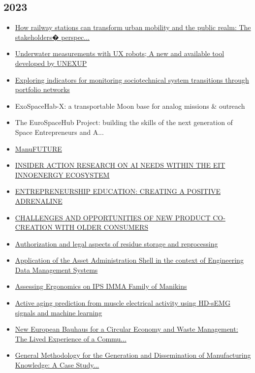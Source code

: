 \subsection*{2023}
\begin{itemize}[leftmargin=*, itemsep=0em, label=\textbullet]
\small
\item \href{https://doi.org/10.1016/j.urbmob.2023.100047}{How railway stations can transform urban mobility and the public realm: The stakeholders� perspec...}
\item \href{https://doi.org/10.5194/adgeo-62-1-2023}{Underwater measurements with UX robots; A new and available tool developed by UNEXUP}
\item \href{https://doi.org/10.1093/scipol/scad015}{Exploring indicators for monitoring sociotechnical system transitions through portfolio networks}
\item ExoSpaceHab-X: a transportable Moon base for analog missions \& outreach
\item The EuroSpaceHub Project: building the skills of the next generation of Space Entrepreneurs and A...
\item \href{https://doi.org/10.1007/978-3-031-20752-5_11}{ManuFUTURE}
\item \href{https://doi.org/10.21427/9VCN-QW52}{INSIDER ACTION RESEARCH ON AI NEEDS WITHIN THE EIT INNOENERGY ECOSYSTEM}
\item \href{https://doi.org/10.21427/JE0R-Q066}{ENTREPRENEURSHIP EDUCATION: CREATING A POSITIVE ADRENALINE}
\item \href{https://doi.org/10.4324/9781003254829-14}{CHALLENGES AND OPPORTUNITIES OF NEW PRODUCT CO-CREATION WITH OLDER CONSUMERS}
\item \href{https://doi.org/10.1016/B978-0-323-95175-3.00004-0}{Authorization and legal aspects of residue storage and reprocessing}
\item \href{https://doi.org/10.1109/ETFA54631.2023.10275383}{Application of the Asset Administration Shell in the context of Engineering Data Management Systems}
\item \href{https://doi.org/10.1007/978-3-031-35741-1_19}{Assessing Ergonomics on IPS IMMA Family of Manikins}
\item \href{https://doi.org/10.1109/CBMS58004.2023.00310}{Active aging prediction from muscle electrical activity using HD-sEMG signals and machine learning}
\item \href{https://doi.org/10.3390/su15020914}{New European Bauhaus for a Circular Economy and Waste Management: The Lived Experience of a Commu...}
\item \href{https://doi.org/10.1007/978-3-031-25182-5_3}{General Methodology for the Generation and Dissemination of Manufacturing Knowledge: A Case Study...}
\end{itemize}

